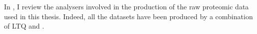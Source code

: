 In ,
I review the analysers involved in
the production of the raw proteomic data used in this thesis.
Indeed, all the datasets have been
produced by a combination of \acrfull{LTQ} and \orbi.%
\mybr\
\begin{comment}
\minisec{Quadrupole analyser}

It is one of the most popular analysers. In fact, they are cheap compared to the
others. They are also compact, durable and reliable. The quadrupole analyser can
filter the ions based on their difference of $m/z$. They are adequately
named quadrupole as they comprise four cylindrical or hyperbolic rods in
parallel to each other. Opposite rods are connected together electrically and
\gls{RF} potential is applied. A \gls{DC} potential is superimposed on the
\gls{RF} one. These combinations of \gls{RF} and \gls{DC} potentials constrain the
ions to oscillate between the rods as they pass through them. Hence, by tuning
the \gls{RF} and \gls{DC}, it is easy to select for which range of $m/z$ ions
will have a stable trajectory and thus the only one detected. Indeed, the
ions with unstable trajectory will collide with the rods and be \enquote{filtered}
out. If used in \enquote{\gls{RF}-only} mode (\gls{DC} reduced to a minimum),
the quadrupole may have other applications. For example, it can guide specific
$m/z$ ions to other areas (while the bulk of ions will remain trapped).
It may also be used as collision cells for \gls{CID}: by introducing an inert
gas and tuning with the \gls{RF}-energy, the amount of fragmentation undergone
by the targeted ions can be precisely controlled. \mycite{Haag2016}\\
The quadrupole analyser is also qualified as the \emph{mass filter}.\mybr\

\minisec{\Acrfull{LTQ}}
\gls{LTQ} is a particular kind of \acrfull{LIT} which is in principle a sort of
a quadrupole mass analyser~\mycite{Zhang2014}. A \gls{LTQ} uses a set of
quadrupole rods and a two-dimensional \gls{RF} field confines the ions radially.
Besides, a static electrical potential is applied to end electrodes which
forbid the ions to escape axially. However, the quadrupole is commonly segmented
into three parts which ensure a perfect homogeneity of the electric field of the
trap area and thus avoiding ion loss when the trapping is done.
While they may be used as an ion trap, they
may be also used as a simple mass filter. \gls{RF} voltage is tuned to produce
multi-frequency resonance ejection waveforms are applied as to
eliminate all the undesirable ions in the trap before the fragmentation and mass
analysis of the remaining ones. Frequently, these \glspl{LTQ} are used as a
front-end to other mass analysers as they have high injection efficiencies and
high ion storage capacities. They may be equipped then with two biased radial
ejection slits and then be used with two detectors hence the signal-to-noise
ratio may be doubled.\mybr\


\end{comment}
